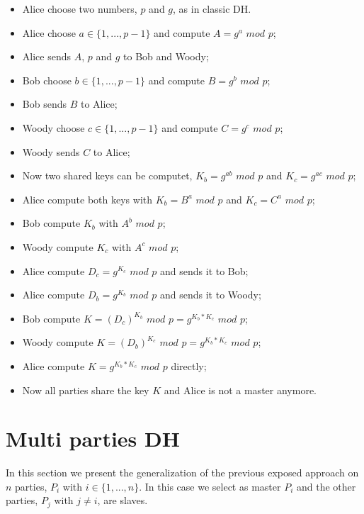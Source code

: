 \documentclass[11pt]{article}
\begin{document}
\begin{itemize}
    \item Alice choose two numbers, $p$ and $g$, as in classic DH.
    \item Alice choose $a \in \{1, ..., p-1\}$ and compute $A = g^a$ $mod$ $p$;
    \item Alice sends $A$, $p$ and $g$ to Bob and Woody;
    \item Bob choose $b \in \{1, ..., p-1\}$ and compute $B = g^b$ $mod$ $p$;
    \item Bob sends $B$ to Alice;
    \item Woody choose $c \in \{1, ..., p-1\}$ and compute $C = g^c$ $mod$ $p$;
    \item Woody sends $C$ to Alice;
    \item Now two shared keys can be computet, $K_b = g^{ab}$ $mod$ $p$ and $K_c = g^{ac}$ $mod$ $p$;
    \item Alice compute both keys with $K_b = B^a$ $mod$ $p$ and $K_c = C^a$ $mod$ $p$;
    \item Bob compute $K_b$ with $A^b$ $mod$ $p$;
    \item Woody compute $K_c$ with $A^c$ $mod$ $p$;
    \item Alice compute $D_c = g^{K_c}$ $mod$ $p$ and sends it to Bob;
    \item Alice compute $D_b = g^{K_b}$ $mod$ $p$ and sends it to Woody;
    \item Bob compute $K = (D_c)^{K_b}$ $mod$ $p = g^{K_b*K_c}$ $mod$ $p$;
    \item Woody compute $K = (D_b)^{K_c}$ $mod$ $p = g^{K_b*K_c}$ $mod$ $p$;
    \item Alice compute $K = g^{K_b*K_c}$ $mod$ $p$ directly;
    \item Now all parties share the key $K$ and Alice is not a master anymore.
\end{itemize}

\section{Multi parties DH}

In this section we present the generalization of the previous exposed approach on $n$ parties, $P_i$ with $i \in \{1, ..., n\}$. In this case we select as master $P_i$ and the other parties, $P_j$ with $j \neq i$, are slaves.
\end{document}
